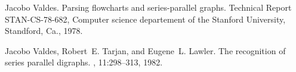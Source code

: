 \documentclass{CSML}
\begin{document}
\begin{thebibliography}{LW98b}
Jacobo Valdes.
\newblock Parsing flowcharts and series-parallel graphs.
\newblock Technical Report STAN-CS-78-682, Computer science departement of the
  Stanford University, Standford, Ca., 1978.

Jacobo Valdes, Robert~E. Tarjan, and Eugene~L. Lawler.
\newblock The recognition of series parallel digraphs.
, 11:298--313, 1982.

\end{thebibliography}
\end{document}
